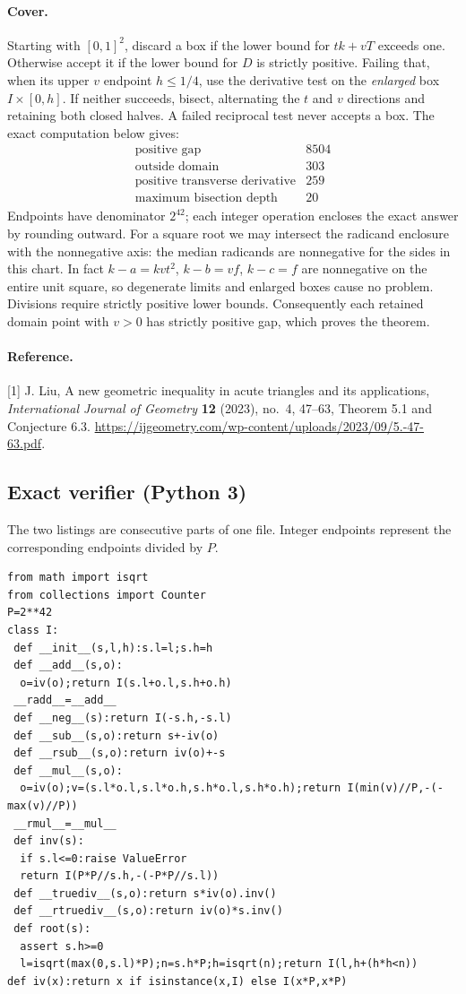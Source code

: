 \documentclass[11pt,a4paper]{article}
\numberwithin{equation}{section}
\theoremstyle{definition}
\theoremstyle{remark}
\begin{document}
\paragraph{Cover.}
Starting with $[0,1]^2$, discard a box if the lower bound for $tk+vT$ exceeds one. Otherwise accept it if the lower bound for $D$ is strictly positive. Failing that, when its upper $v$ endpoint $h\leq1/4$, use the derivative test on the \emph{enlarged} box $I\times[0,h]$. If neither succeeds, bisect, alternating the $t$ and $v$ directions and retaining both closed halves. A failed reciprocal test never accepts a box. The exact computation below gives:
\[
\begin{array}{lr}
\text{positive gap} &8504\\
\text{outside domain}&303\\
\text{positive transverse derivative}&259\\ \hline
\text{maximum bisection depth} & 20
\end{array}
\]
Endpoints have denominator $2^{42}$; each integer operation encloses the exact answer by rounding outward. For a square root we may intersect the radicand enclosure with the nonnegative axis: the median radicands are nonnegative for the sides in this chart. In fact $k-a=kvt^2$, $k-b=vf$, $k-c=f$ are nonnegative on the entire unit square, so degenerate limits and enlarged boxes cause no problem. Divisions require strictly positive lower bounds. Consequently each retained domain point with $v>0$ has strictly positive gap, which proves the theorem.

\paragraph{Reference.} [1] J. Liu, A new geometric inequality in acute triangles and its applications, \emph{International Journal of Geometry} \textbf{12} (2023), no.~4, 47--63, Theorem 5.1 and Conjecture 6.3.
\url{https://ijgeometry.com/wp-content/uploads/2023/09/5.-47-63.pdf}.
\subsection*{Exact verifier (Python 3)}
\noindent The two listings are consecutive parts of one file. Integer endpoints represent the corresponding endpoints divided by $P$.
\small
\begin{Verbatim}
from math import isqrt
from collections import Counter
P=2**42
class I:
 def __init__(s,l,h):s.l=l;s.h=h
 def __add__(s,o):
  o=iv(o);return I(s.l+o.l,s.h+o.h)
 __radd__=__add__
 def __neg__(s):return I(-s.h,-s.l)
 def __sub__(s,o):return s+-iv(o)
 def __rsub__(s,o):return iv(o)+-s
 def __mul__(s,o):
  o=iv(o);v=(s.l*o.l,s.l*o.h,s.h*o.l,s.h*o.h);return I(min(v)//P,-(-max(v)//P))
 __rmul__=__mul__
 def inv(s):
  if s.l<=0:raise ValueError
  return I(P*P//s.h,-(-P*P//s.l))
 def __truediv__(s,o):return s*iv(o).inv()
 def __rtruediv__(s,o):return iv(o)*s.inv()
 def root(s):
  assert s.h>=0
  l=isqrt(max(0,s.l)*P);n=s.h*P;h=isqrt(n);return I(l,h+(h*h<n))
def iv(x):return x if isinstance(x,I) else I(x*P,x*P)
\end{Verbatim}
\end{document}
